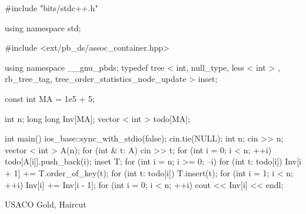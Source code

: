 \documentclass{trkut}
\begin{document}
\begin{cclol}
#include "bits/stdc++.h"

using namespace std;

#include <ext/pb_ds/assoc_container.hpp>

using namespace __gnu_pbds;
typedef tree < int, null_type, less < int > , 
rb_tree_tag, tree_order_statistics_node_update > inset;

const int MA = 1e5 + 5;

int n;
long long Inv[MA];
vector < int > todo[MA];

int main() {
  ios_base::sync_with_stdio(false);
  cin.tie(NULL);
  int n;
  cin >> n;
  vector < int > A(n);
  for (int & t: A) cin >> t;
  for (int i = 0; i < n; ++i) todo[A[i]].push_back(i);
  inset T;
  for (int i = n; i >= 0; --i) {
    for (int t: todo[i]) Inv[i + 1] += T.order_of_key(t);
    for (int t: todo[i]) T.insert(t);
  }
  for (int i = 1; i < n; ++i) Inv[i] += Inv[i - 1];
  for (int i = 0; i < n; ++i) cout << Inv[i] << endl;
}
\end{cclol}
\begin{kk}[H]
    \caption{USACO Gold, Haircut}%
    \end{kk}
\end{document}
